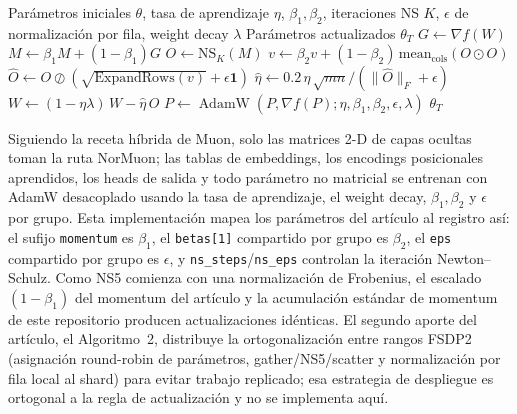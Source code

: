 \begin{algorithm}[H]
\caption{NorMuon (Muon Normalizado por Neurona)}
\label{alg:normuon}
\begin{algorithmic}[1]
\Require Parámetros iniciales $\theta$, tasa de aprendizaje $\eta$, $\beta_1, \beta_2$, iteraciones NS $K$, $\epsilon$ de normalización por fila, weight decay $\lambda$
\Ensure Parámetros actualizados $\theta_T$
        \State $G \gets \nabla f(W)$ 
        \State $M \gets \beta_1 M + (1-\beta_1) G$ 
        \State $O \gets \mathrm{NS}_K(M)$ 
        \State $v \gets \beta_2 v + (1-\beta_2)\,\mathrm{mean}_{\mathrm{cols}}(O \odot O)$ 
        \State $\widehat{O} \gets O \oslash (\sqrt{\mathrm{ExpandRows}(v)} + \epsilon\mathbf{1})$ 
        \State $\hat\eta \gets 0.2\,\eta\,\sqrt{mn} / (\|\widehat{O}\|_F + \epsilon)$ 
        \State $W \gets (1-\eta\lambda)\,W - \hat\eta\,\widehat{O}$ 
    \Else
        \State $P \gets \operatorname{AdamW}(P, \nabla f(P); \eta, \beta_1, \beta_2, \epsilon, \lambda)$ 
    \EndIf
\EndFor
\Return $\theta_T$
\end{algorithmic}
\end{algorithm}

Siguiendo la receta híbrida de Muon, solo las matrices 2-D de capas ocultas toman la ruta
NorMuon; las tablas de embeddings, los encodings posicionales aprendidos, los heads de
salida y todo parámetro no matricial se entrenan con AdamW desacoplado usando la tasa de
aprendizaje, el weight decay, $\beta_1, \beta_2$ y $\epsilon$ por grupo. Esta
implementación mapea los parámetros del artículo al registro así: el sufijo
\texttt{momentum} es $\beta_1$, el \texttt{betas[1]} compartido por grupo es $\beta_2$,
el \texttt{eps} compartido por grupo es $\epsilon$, y \texttt{ns\_steps}/\texttt{ns\_eps}
controlan la iteración Newton--Schulz. Como NS5 comienza con una normalización de
Frobenius, el escalado $(1-\beta_1)$ del momentum del artículo y la acumulación estándar
de momentum de este repositorio producen actualizaciones idénticas. El segundo aporte del
artículo, el Algoritmo~2, distribuye la ortogonalización entre rangos FSDP2 (asignación
round-robin de parámetros, gather/NS5/scatter y normalización por fila local al shard)
para evitar trabajo replicado; esa estrategia de despliegue es ortogonal a la regla de
actualización y no se implementa aquí.

